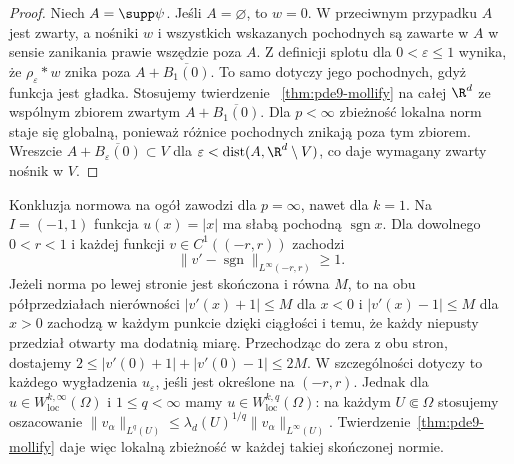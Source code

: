 \begin{proof}
Niech $A=\supp\psi$. Jeśli $A=\varnothing$, to $w=0$.
W przeciwnym przypadku $A$ jest zwarty, a nośniki
$w$ i wszystkich wskazanych pochodnych są zawarte w $A$
w sensie zanikania prawie wszędzie poza $A$.
Z definicji splotu dla $0<\varepsilon\le1$
wynika, że $\rho_\varepsilon*w$ znika poza
$A+\overline{B_1(0)}$. To samo dotyczy jego pochodnych,
gdyż funkcja jest gładka. Stosujemy twierdzenie
~\ref{thm:pde9-mollify} na całej $\R^d$ ze wspólnym
zbiorem zwartym $A+\overline{B_1(0)}$.
Dla $p<\infty$ zbieżność lokalna norm staje się
globalną, ponieważ różnice pochodnych znikają poza
tym zbiorem. Wreszcie
$A+\overline{B_\varepsilon(0)}\subset V$ dla
$\varepsilon<\operatorname{dist}(A,\R^d\setminus V)$,
co daje wymagany zwarty nośnik w $V$.
\end{proof}

\begin{uwaga}[Dlaczego nie $p=\infty$?]
Konkluzja normowa na ogół zawodzi dla $p=\infty$,
nawet dla $k=1$. Na $I=(-1,1)$ funkcja $u(x)=|x|$
ma słabą pochodną $\operatorname{sgn}x$.
Dla dowolnego $0<r<1$ i każdej funkcji
$v\in C^1((-r,r))$ zachodzi
\[
 \|v'-\operatorname{sgn}\|_{L^\infty(-r,r)}\ge1.
\]
Jeżeli norma po lewej stronie jest skończona i równa $M$,
to na obu półprzedziałach nierówności
$|v'(x)+1|\le M$ dla $x<0$ i $|v'(x)-1|\le M$ dla $x>0$
zachodzą w każdym punkcie dzięki ciągłości i temu,
że każdy niepusty przedział otwarty ma dodatnią miarę.
Przechodząc do zera z obu stron, dostajemy
$2\le|v'(0)+1|+|v'(0)-1|\le2M$.
W szczególności dotyczy to każdego wygładzenia $u_\varepsilon$,
jeśli jest określone na $(-r,r)$.
Jednak dla $u\in W^{k,\infty}_{\mathrm{loc}}(\Omega)$
i $1\le q<\infty$ mamy
$u\in W^{k,q}_{\mathrm{loc}}(\Omega)$: na każdym
$U\Subset\Omega$ stosujemy oszacowanie
$\|v_\alpha\|_{L^q(U)}\le
\lambda_d(U)^{1/q}\|v_\alpha\|_{L^\infty(U)}$.
Twierdzenie~\ref{thm:pde9-mollify} daje więc lokalną
zbieżność w każdej takiej skończonej normie.
\end{uwaga}

